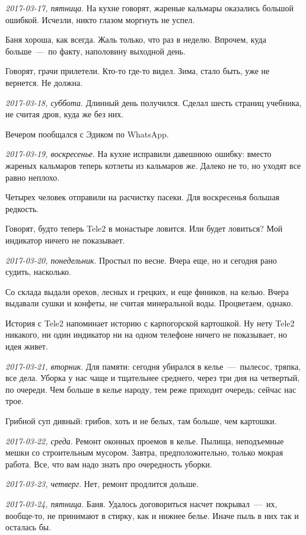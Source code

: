 \documentclass[
    12pt
    ,a4paper
    ,oneside
    ,russian
]{memoir}
\newcommand{\mydatestamp}{
    \bigskip   %
    \emph
}
\newcommand{\mds}{\mydatestamp}
\begin{document}
    \mds{2017-03-17, пятница}. На кухне говорят, жареные кальмары оказались большой ошибкой. Исчезли, никто глазом моргнуть не успел.
    
    Баня хороша, как всегда. Жаль только, что раз в неделю. Впрочем, куда больше~---~по факту, наполовину выходной день.
    
    Говорят, грачи прилетели. Кто-то где-то видел. Зима, стало быть, уже не вернется. Не должна.
    
    \mds{2017-03-18, суббота}. Длинный день получился. Сделал шесть страниц учебника, не считая дров, куда же без них.
    
    Вечером пообщался с Эдиком по WhatsApp.
    
    \mds{2017-03-19, воскресенье}. На кухне исправили давешнюю ошибку: вместо жареных кальмаров теперь котлеты из кальмаров же. Далеко не то, но уходят все равно неплохо.
    
    Четырех человек отправили на расчистку пасеки. Для воскресенья большая редкость.
    
    Говорят, будто теперь Tele2 в монастыре ловится. Или будет ловиться? Мой индикатор ничего не показывает.
    
    \mds{2017-03-20, понедельник}. Простыл по весне. Вчера еще, но и сегодня рано судить, насколько.
    
    Со склада выдали орехов, лесных и грецких, и еще фиников, на келью. Вчера выдавали сушки и конфеты, не считая минеральной воды. Процветаем, однако.
    
    История с Tele2 напоминает историю с карпогорской картошкой. Ну нету Tele2 никакого, ни один индикатор ни на одном телефоне ничего не показывает, но идея живет.
    
    \mds{2017-03-21, вторник}. Для памяти: сегодня убирался в келье~---~пылесос, тряпка, все дела. Уборка у нас чаще и тщательнее среднего, через три дня на четвертый, по очереди. Чем больше в келье народу, тем реже приходит очередь; сейчас нас трое.
    
    Грибной суп дивный: грибов, хоть и не белых, там больше, чем картошки.
    
    \mds{2017-03-22, среда}. Ремонт оконных проемов в келье. Пылища, неподъемные мешки со строительным мусором. Завтра, предположительно, только мокрая работа. Все, что вам надо знать про очередность уборки.
    
    \mds{2017-03-23, четверг}. Нет, ремонт продлится дольше.
    
    \mds{2017-03-24, пятница}. Баня. Удалось договориться насчет покрывал~---~их, вообще-то, не принимают в стирку, как и нижнее белье. Иначе пыль в них так и осталась бы.
    
\end{document}

